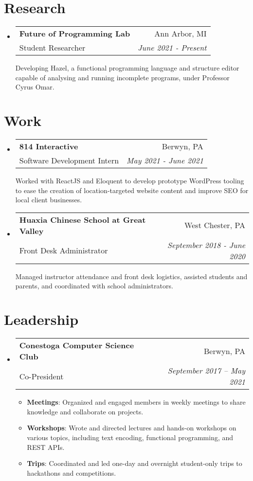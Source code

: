 \documentclass[letterpaper,11pt]{article}
\makeatletter
\newcommand{\resumeSubheading}[4]{
  \vspace{-2pt}\item
    \begin{tabular*}{0.97\textwidth}[t]{l@{\extracolsep{\fill}}r}
      \textbf{#1} & #2 \\
      {#3} & \textit{\small #4} \\[3pt]
    \end{tabular*}\vspace{-5pt}
}
\newcommand{\resumeSubheadingDescription}[1]{
  \parbox{0.97\textwidth}{#1}
}
\newenvironment{resumeSubHeadingList}{
  \begin{itemize}[leftmargin=*, label={}]
}{
  \end{itemize}
}
\newenvironment{resumeItemList}{
  \vspace{-2pt}
  \begin{itemize}
}{
  \end{itemize}
  \vspace{-5pt}
}
\newcommand{\resumeItem}[2]{\item\small{\textbf{#1}{: #2 \vspace{-2pt}}}}
\makeatother
\begin{document}
\section{Research}

  \begin{resumeSubHeadingList}
    \resumeSubheading%
      {Future of Programming Lab}%
      {Ann Arbor, MI}%
      {Student Researcher}%
      {June 2021 - Present}

      \resumeSubheadingDescription{
        Developing Hazel, a functional programming language and structure editor capable of
        analysing and running incomplete programs, under Professor Cyrus Omar.
      }
  \end{resumeSubHeadingList}

\section{Work}
  \begin{resumeSubHeadingList}

    \resumeSubheading%
      {814 Interactive}%
      {Berwyn, PA}%
      {Software Development Intern}%
      {May 2021 - June 2021}

      \resumeSubheadingDescription{
        Worked with ReactJS and Eloquent to develop prototype WordPress tooling to ease the creation
        of location-targeted website content and improve SEO for local client businesses.
      }

    \resumeSubheading%
      {Huaxia Chinese School at Great Valley}%
      {West Chester, PA}%
      {Front Desk Administrator}%
      {September 2018 - June 2020}

      \resumeSubheadingDescription{
        Managed instructor attendance and front desk logistics, assisted students and parents, and
        coordinated with school administrators.
      }

  \end{resumeSubHeadingList}

\section{Leadership}
  \begin{resumeSubHeadingList}

    \resumeSubheading%
      {Conestoga Computer Science Club}%
      {Berwyn, PA}%
      {Co-President}%
      {September 2017 -- May 2021}

      \begin{resumeItemList}
        \resumeItem{Meetings}%
          {Organized and engaged members in weekly meetings to share knowledge and collaborate on
            projects.}
        \resumeItem{Workshops}%
          {Wrote and directed lectures and hands-on workshops on various topics, including text encoding,
            functional programming, and REST APIs.}
        \resumeItem{Trips}%
          {Coordinated and led one-day and overnight student-only trips to hackathons and
            competitions.}
      \end{resumeItemList}

  \end{resumeSubHeadingList}
\end{document}
